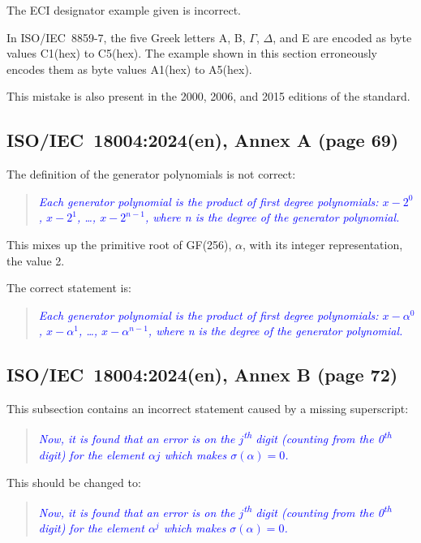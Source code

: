 \documentclass[a4paper,twoside]{article}
\newcommand{\shortstandard}{ISO/IEC~18004}
\newcommand{\standard}{\shortstandard:2024(en)}
\newcommand{\quotestandard}[1]{\textcolor{blue}{\textit{#1}}}
\newcommand{\change}[1]{\underline{\textbf{#1}}}
\newcommand{\hex}[1]{#1(hex)}
\begin{document}
The ECI designator example given is incorrect.

In ISO/IEC~8859-7, the five Greek letters A, B, $\Gamma$, $\Delta$, and E are encoded as byte values \hex{C1} to \hex{C5}.
The example shown in this section erroneously encodes them as byte values \hex{A1} to \hex{A5}.

This mistake is also present in the 2000, 2006, and 2015 editions of the standard.

\subsection{\standard, Annex A (page 69)}

The definition of the generator polynomials is not correct:

\begin{quote}
\quotestandard{Each generator polynomial is the product of first degree polynomials: $x - 2^0$, $x - 2^1$, \dots, $x - 2^{n-1}$,
where n is the degree of the generator polynomial.}
\end{quote}

This mixes up the primitive root of GF(256), $\alpha$, with its integer representation, the value 2.

The correct statement is:

\begin{quote}
\quotestandard{Each generator polynomial is the product of first degree polynomials: \change{$x - \alpha^0$}, \change{$x - \alpha^1$}, \dots, \change{$x - \alpha^{n-1}$},
where n is the degree of the generator polynomial.}
\end{quote}

\subsection{\standard, Annex B (page 72)}
\label{sec:dmp-changed-2}

This subsection contains an incorrect statement caused by a missing superscript:

\begin{quote}
\quotestandard{Now, it is found that an error is on the $j$\textsuperscript{th} digit (counting from the 0\textsuperscript{th} digit) for the element $\alpha j$ which makes $\sigma(\alpha) = 0$.}
\end{quote}

This should be changed to:

\begin{quote}
\quotestandard{Now, it is found that an error is on the $j$\textsuperscript{th} digit (counting from the 0\textsuperscript{th} digit) for the element \change{$\alpha^j$} which makes $\sigma(\alpha) = 0$.}
\end{quote}
\end{document}
